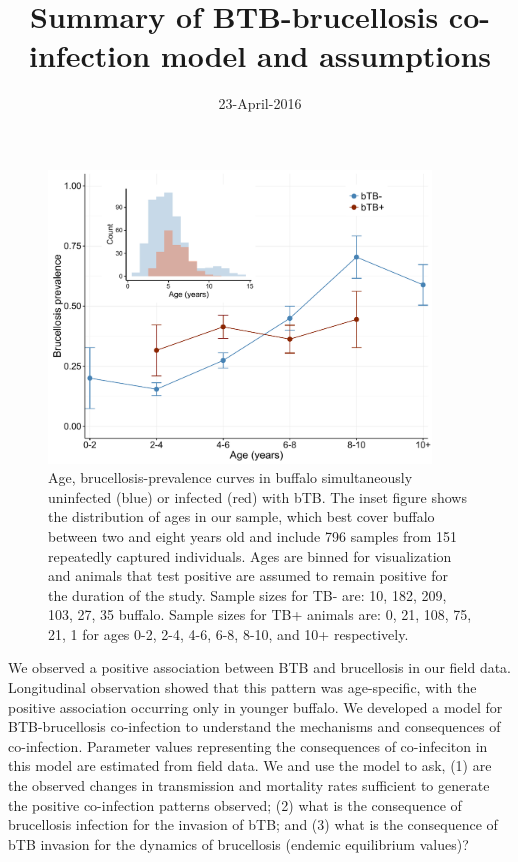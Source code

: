 \documentclass[letterpaper,12pt]{article}
\begin{document}
\linenumbers

\title{Summary of BTB-brucellosis co-infection model and assumptions}
\date{23-April-2016}

\maketitle
\doublespacing

\begin{figure}
\begin{center}
\includegraphics[width=4in]{Figure1_ageprev.pdf}
\end{center}
\caption{Age, brucellosis-prevalence curves in buffalo simultaneously uninfected (blue) or infected (red) with bTB.  The inset figure shows the distribution of ages in our sample, which best cover buffalo between two and eight years old and include 796 samples from 151 repeatedly captured individuals.  Ages are binned for visualization and animals that test positive are assumed to remain positive for the duration of the study.  Sample sizes for TB- are: 10, 182, 209, 103, 27, 35 buffalo.  Sample sizes for TB+ animals are: 0, 21, 108, 75, 21, 1 for ages 0-2, 2-4, 4-6, 6-8, 8-10, and 10+ respectively.}
\label{fig1}
\end{figure}

We observed a positive association between BTB and brucellosis in our field data.  
Longitudinal observation showed that this pattern was age-specific, with the positive association occurring only in younger buffalo.  
We developed a model for BTB-brucellosis co-infection to understand the mechanisms and consequences of co-infection.
Parameter values representing the consequences of co-infeciton in this model are estimated from field data.  
We and use the model to ask, (1) are the observed changes in transmission and mortality rates sufficient to generate the positive co-infection patterns observed; (2) what is the consequence of brucellosis infection for the invasion of bTB; and (3) what is the consequence of bTB invasion for the dynamics of brucellosis (endemic equilibrium values)?
\end{document}
